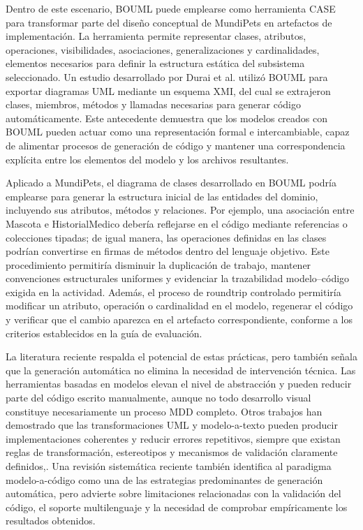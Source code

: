 \documentclass{article}
\begin{document}
Dentro de este escenario, BOUML puede emplearse como herramienta CASE para transformar parte del diseño conceptual de MundiPets en artefactos de implementación. La herramienta permite representar clases, atributos, operaciones, visibilidades, asociaciones, generalizaciones y cardinalidades, elementos necesarios para definir la estructura estática del subsistema seleccionado. Un estudio desarrollado por Durai et al. utilizó BOUML para exportar diagramas UML mediante un esquema XMI, del cual se extrajeron clases, miembros, métodos y llamadas necesarias para generar código automáticamente\cite{Durai2022XMI}. Este antecedente demuestra que los modelos creados con BOUML pueden actuar como una representación formal e intercambiable, capaz de alimentar procesos de generación de código y mantener una correspondencia explícita entre los elementos del modelo y los archivos resultantes.

Aplicado a MundiPets, el diagrama de clases desarrollado en BOUML podría emplearse para generar la estructura inicial de las entidades del dominio, incluyendo sus atributos, métodos y relaciones. Por ejemplo, una asociación entre Mascota e HistorialMedico debería reflejarse en el código mediante referencias o colecciones tipadas; de igual manera, las operaciones definidas en las clases podrían convertirse en firmas de métodos dentro del lenguaje objetivo. Este procedimiento permitiría disminuir la duplicación de trabajo, mantener convenciones estructurales uniformes y evidenciar la trazabilidad modelo–código exigida en la actividad. Además, el proceso de roundtrip controlado permitiría modificar un atributo, operación o cardinalidad en el modelo, regenerar el código y verificar que el cambio aparezca en el artefacto correspondiente, conforme a los criterios establecidos en la guía de evaluación.

La literatura reciente respalda el potencial de estas prácticas, pero también señala que la generación automática no elimina la necesidad de intervención técnica. Las herramientas basadas en modelos elevan el nivel de abstracción y pueden reducir parte del código escrito manualmente, aunque no todo desarrollo visual constituye necesariamente un proceso MDD completo\cite{DiRuscio2022LowCodeMDE}. Otros trabajos han demostrado que las transformaciones UML y modelo-a-texto pueden producir implementaciones coherentes y reducir errores repetitivos, siempre que existan reglas de transformación, estereotipos y mecanismos de validación claramente definidos\cite{JimenezNavajas2025QuantumUML},\cite{Huning2021SafetyMechanisms}. Una revisión sistemática reciente también identifica al paradigma modelo-a-código como una de las estrategias predominantes de generación automática, pero advierte sobre limitaciones relacionadas con la validación del código, el soporte multilenguaje y la necesidad de comprobar empíricamente los resultados obtenidos.
\end{document}
